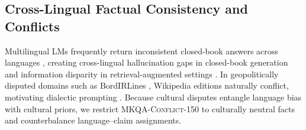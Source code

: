 \subsection{Cross-Lingual Factual Consistency and Conflicts}
\label{subsec:rw_consistency}

Multilingual LMs frequently return inconsistent closed-book answers across languages \citep{fierro2022factual,qi2023crosslingual,wang2025lost}, creating cross-lingual hallucination gaps in closed-book generation \citep{chataigner2025multilingual} and information disparity in retrieval-augmented settings \citep{sharma2025faux}. In geopolitically disputed domains such as BordIRLines \citep{li2024bordirlines,li2025culturally}, Wikipedia editions naturally conflict, motivating dialectic prompting \citep{ranaldi2025improving}. Because cultural disputes entangle language bias with cultural priors, we restrict \textsc{MKQA-Conflict-150} to culturally neutral facts and counterbalance language--claim assignments.
